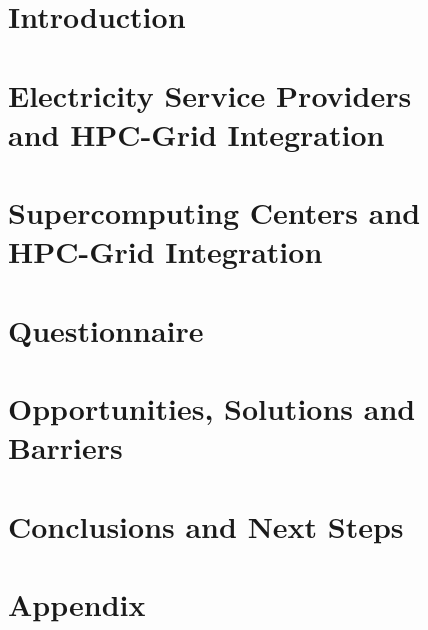 \documentclass{../style/sig-alternate}
\begin{document}


%
\section{Introduction}
\label{sec:intro}


\section{Electricity Service Providers\\
 and HPC-Grid Integration}
\label{sec:ESPintegration}


\section{Supercomputing Centers and \\ HPC-Grid Integration}
\label{sec:supercomputercenters}


\section{Questionnaire} 
\label{sec:questionnaire}


\section{Opportunities, Solutions and\\ Barriers} 

\label{sec:opportunities}

\section{Conclusions and Next Steps}

\label{sec:conclusion}

%
%

%

%

\section*{Appendix}
\label{Appendix}

\end{document}

